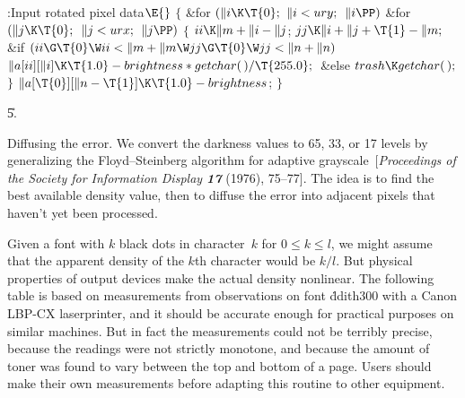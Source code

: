 \Y\B\4:Input rotated pixel data\X${}\E{}$\6
${}\{{}$\1\6
\&{for} ${}(\|i\K\T{0};{}$ ${}\|i<\\{ury};{}$ ${}\|i\PP){}$\1\6
\&{for} ${}(\|j\K\T{0};{}$ ${}\|j<\\{urx};{}$ ${}\|j\PP){}$\5
${}\{{}$\1\6
${}\\{ii}\K\|m+\|i-\|j{}$;\5
${}\\{jj}\K\|i+\|j+\T{1}-\|m;{}$\6
\&{if} ${}(\\{ii}\G\T{0}\W\\{ii}<\|m+\|m\W\\{jj}\G\T{0}\W\\{jj}<\|n+\|n){}$\1\5
${}\|a[\\{ii}][\|i]\K\T{1.0}-\\{brightness}*\\{getchar}(\,)/\T{255.0};{}$\2\6
\&{else}\1\5
${}\\{trash}\K\\{getchar}(\,);{}$\2\6
\4${}\}{}$\2\2\6
${}\|a[\T{0}][\|n-\T{1}]\K\T{1.0}-\\{brightness}{}$;\6
\4${}\}{}$\2\par
\U5.\fi

Diffusing the error. We convert the darkness values to
65, 33, or 17 levels by generalizing the Floyd--Steinberg algorithm
for adaptive grayscale~[{\sl Proceedings of the
Society for Information Display\/ \bf17} (1976), 75--77].
The idea is to find the best
available density value, then to diffuse the error into adjacent
pixels that haven't yet been processed.

Given a font with $k$ black dots in character~$k$ for $0\le k\le l$,
we might assume that the apparent density of the $k$th character
would be $k/l$.
But physical properties of output devices make the actual density
nonlinear. The following table is based on measurements
from observations on font \.{ddith300}
with a Canon {\mc LBP-CX} laserprinter,
and it should be accurate enough for practical purposes on similar
machines. But in fact
the measurements could not be terribly precise, because the readings were not
strictly monotone, and because the amount of toner was found to vary
between the top and bottom of a page. Users should make their
own measurements before adapting this routine to other equipment.

